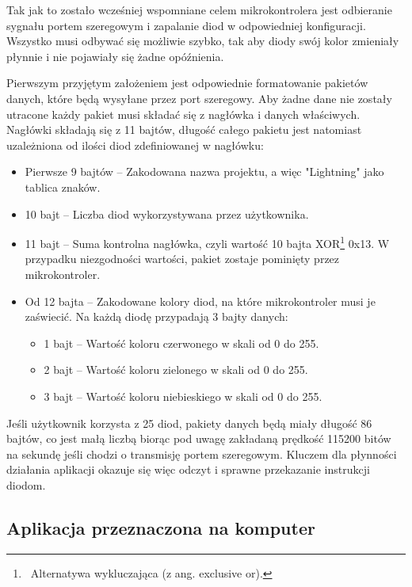 \documentclass[12pt]{report}
\begin{document}
 \label{ino}

Tak jak to zostało wcześniej wspomniane celem mikrokontrolera jest odbieranie sygnału portem szeregowym i zapalanie diod w odpowiedniej konfiguracji. Wszystko musi odbywać się możliwie szybko, tak aby diody swój kolor zmieniały płynnie i nie pojawiały się żadne opóźnienia.

Pierwszym przyjętym założeniem jest odpowiednie formatowanie pakietów danych, które będą wysyłane przez port szeregowy. Aby żadne dane nie zostały utracone każdy pakiet musi składać się z nagłówka i danych właściwych. Nagłówki składają się z 11 bajtów, długość całego pakietu jest natomiast uzależniona od ilości diod zdefiniowanej w nagłówku:

\begin{itemize}
	\item Pierwsze 9 bajtów -- Zakodowana nazwa projektu, a więc "Lightning" jako tablica znaków.
	\item 10 bajt -- Liczba diod wykorzystywana przez użytkownika.
	\item 11 bajt -- Suma kontrolna nagłówka, czyli wartość 10 bajta XOR\footnote{~Alternatywa wykluczająca (z ang. exclusive or).} 0x13. W przypadku niezgodności wartości, pakiet zostaje pominięty przez mikrokontroler.
	\item Od 12 bajta -- Zakodowane kolory diod, na które mikrokontroler musi je zaświecić. Na każdą diodę przypadają 3 bajty danych:
	\begin{itemize}
		\item 1 bajt -- Wartość koloru czerwonego w skali od 0 do 255.
		\item 2 bajt -- Wartość koloru zielonego w skali od 0 do 255.
		\item 3 bajt -- Wartość koloru niebieskiego w skali od 0 do 255.
	\end{itemize}
\end{itemize}

Jeśli użytkownik korzysta z 25 diod, pakiety danych będą miały długość 86 bajtów, co jest małą liczbą biorąc pod uwagę zakładaną prędkość 115200 bitów na sekundę jeśli chodzi o transmisję portem szeregowym. Kluczem dla płynności działania aplikacji okazuje się więc odczyt i sprawne przekazanie instrukcji diodom.


\subsection{Aplikacja przeznaczona na komputer}
\end{document}
